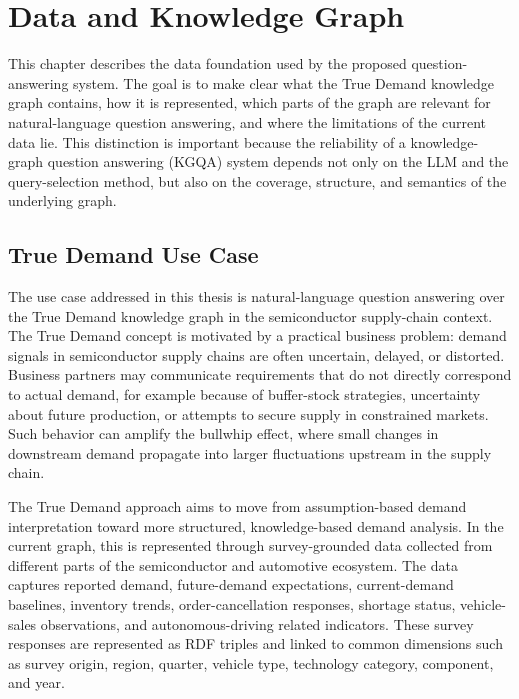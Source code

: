 \chapter{Data and Knowledge Graph}
\label{chap:data-kg}

This chapter describes the data foundation used by the proposed question-answering system. The goal is to make clear what the True Demand knowledge graph contains, how it is represented, which parts of the graph are relevant for natural-language question answering, and where the limitations of the current data lie. This distinction is important because the reliability of a knowledge-graph question answering (KGQA) system depends not only on the LLM and the query-selection method, but also on the coverage, structure, and semantics of the underlying graph.

\section{True Demand Use Case}
\label{sec:true-demand-use-case}

The use case addressed in this thesis is natural-language question answering over the True Demand knowledge graph in the semiconductor supply-chain context. The True Demand concept is motivated by a practical business problem: demand signals in semiconductor supply chains are often uncertain, delayed, or distorted. Business partners may communicate requirements that do not directly correspond to actual demand, for example because of buffer-stock strategies, uncertainty about future production, or attempts to secure supply in constrained markets. Such behavior can amplify the bullwhip effect, where small changes in downstream demand propagate into larger fluctuations upstream in the supply chain.

The True Demand approach aims to move from assumption-based demand interpretation toward more structured, knowledge-based demand analysis. In the current graph, this is represented through survey-grounded data collected from different parts of the semiconductor and automotive ecosystem. The data captures reported demand, future-demand expectations, current-demand baselines, inventory trends, order-cancellation responses, shortage status, vehicle-sales observations, and autonomous-driving related indicators. These survey responses are represented as RDF triples and linked to common dimensions such as survey origin, region, quarter, vehicle type, technology category, component, and year.

